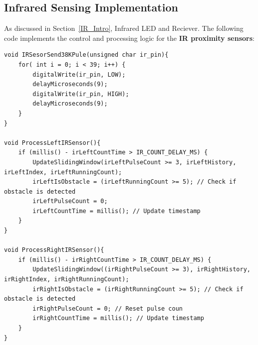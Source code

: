 \subsection{Infrared Sensing Implementation}
As discussed in Section~\ref{IR_Intro}, Infrared LED and Reciever.
The following code implements the control and processing logic for the \textbf{IR proximity sensors}:
\begin{lstlisting}[style=cppstyle2]
void IRSesorSend38KPule(unsigned char ir_pin){
	for( int i = 0; i < 39; i++) {
		digitalWrite(ir_pin, LOW);
		delayMicroseconds(9);
		digitalWrite(ir_pin, HIGH);
		delayMicroseconds(9);
	}
}

void ProcessLeftIRSensor(){
	if (millis() - irLeftCountTime > IR_COUNT_DELAY_MS) {
		UpdateSlidingWindow(irLeftPulseCount >= 3, irLeftHistory, irLeftIndex, irLeftRunningCount);    
		irLeftIsObstacle = (irLeftRunningCount >= 5); // Check if obstacle is detected
		irLeftPulseCount = 0;
		irLeftCountTime = millis(); // Update timestamp
	}
}

void ProcessRightIRSensor(){
	if (millis() - irRightCountTime > IR_COUNT_DELAY_MS) {
		UpdateSlidingWindow((irRightPulseCount >= 3), irRightHistory, irRightIndex, irRightRunningCount);
		irRightIsObstacle = (irRightRunningCount >= 5); // Check if obstacle is detected
		irRightPulseCount = 0; // Reset pulse coun
		irRightCountTime = millis(); // Update timestamp
	}
}
\end{lstlisting}

